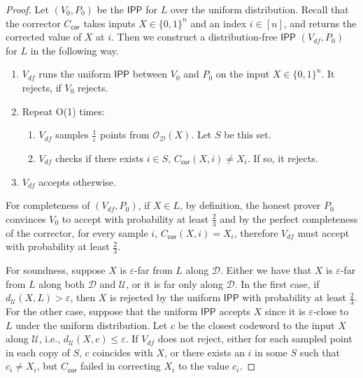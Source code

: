\documentclass[10pt,a4paper]{article}
\newcommand{\IPP}{\mathsf{IPP}}
\newcommand{\sU}{\mathcal{U}}
\newcommand{\sD}{\mathcal{D}}
\newcommand{\sO}{\mathcal{O}}
\begin{document}
\begin{proof}
Let $(V_0, P_0)$ be the $\IPP$ for $L$ over the uniform distribution. Recall that the corrector $C_{\mathsf{cor}}$ takes inputs $X \in \{0,1\}^{n} $ and an index $i \in [n]$, and returns the corrected value of $X$ at $i$.  Then we construct a distribution-free $\IPP$ $(V_{df}, P_0)$ for $L$ in the following way.

\begin{algorithm}
\label{pcl:rlcc_dfipp}
\caption{Distribution-free $\IPP$ for a subset of an RLCC $C$, with corrector $C_{\mathsf{cor}}$.}
\label{RLCCDFIPP}
\begin{enumerate}
    \item $V_{df}$ runs the uniform $\IPP$ between $V_0$ and $P_0$ on the input $X \in \{0,1\}^n$. It rejects, if $V_{0}$ rejects.
    \item \label{it:4repsrlcc} Repeat O(1) times:
        \begin{enumerate}
            \item \label{it:samplerlcc} $V_{df}$ samples $\frac{1}{\varepsilon}$ points from $\sO_\mathcal{D}(X)$. Let $S$ be this set.
            \item $V_{df}$ checks if there exists $i \in S$, $C_{\mathsf{cor}}(X, i) \neq X_{i}$. If so, it rejects. 
    \end{enumerate}
\item $V_{df}$ accepts otherwise.
\end{enumerate}
\end{algorithm}

For completeness of $(V_{df}, P_0)$, if $X\in L$, by definition, the honest prover $P_0$ convinces $V_0$ to accept with probability at least $\frac{2}{3}$ and by the perfect completeness of the corrector, for every sample $i$, $C_{\mathsf{cor}}(X,i)=X_{i}$, therefore $V_{df}$ must accept with probability at least $\frac{2}{3}$.  

For soundness, suppose $X$ is $\varepsilon$-far from $L$ along $\sD$. Either we have that $X$ is $\varepsilon$-far from $L$ along both $\sD$ and $\sU$, or it is far only along $\sD$. In the first case, if $d_{\mathcal{U}}(X,L)>\varepsilon$, then $X$ is rejected by the uniform $\IPP$ with probability at least $\frac{2}{3}$. For the other case, suppose that the uniform $\IPP$ accepts $X$ since it is $\varepsilon$-close to $L$ under the uniform distribution. Let $c$ be the closest codeword to the input $X$ along $\sU$, i.e., $d_{\sU}(X,c)\leq \varepsilon$. If $V_{df}$ does not reject, either for each sampled point in each copy of $S$, $c$ coincides with $X$, or there exists an $i$ in some $S$ such that $c_i \neq X_i$, but $C_{\mathsf{cor}}$ failed in correcting $X_{i}$ to the value $c_i$.


\end{proof}
\end{document}
